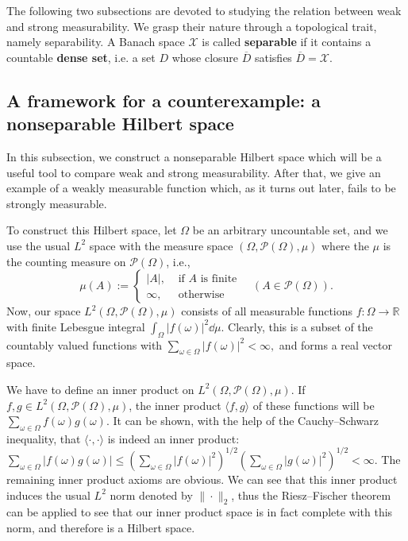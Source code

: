\documentclass[a4paper, 12pt]{article}
\newcommand{\ignore}[1]{}
\begin{document}
The following two subsections are devoted to studying the relation between weak and strong measurability. We grasp their nature through a topological trait, namely separability. A Banach space $\mathcal{X}$ is called \textbf{separable} if it contains a countable \textbf{dense set}, i.e. a set $D$ whose closure $\overline{D}$ satisfies $\overline{D} = \mathcal{X}$.
\subsection{A framework for a counterexample: a nonseparable Hilbert space}\label{section:nonseparable-hilbert-space}
In this subsection, we construct a nonseparable Hilbert space which will be a useful tool to compare weak and strong measurability. After that, we give an example of a weakly measurable function which, as it turns out later, fails to be strongly measurable.

To construct this Hilbert space, let $\Omega$ be an arbitrary uncountable set, and we use the usual $L^2$ space with the measure space $(\Omega, \mathcal{P}(\Omega), \mu)$ where the $\mu$ is the counting measure on $\mathcal{P}(\Omega)$, i.e.,
$$
\mu(A) := \left\{
    \begin{array}{ll}
      |A|, &\text{ if } A \text{ is finite} \\
      \infty, &\text{ otherwise}
    \end{array}
\right. \quad (A \in \mathcal{P}(\Omega)).
$$
Now, our space $L^2(\Omega, \mathcal{P}(\Omega), \mu)$ consists of all measurable functions $f \colon \Omega \rightarrow \mathbb{R}$ with finite Lebesgue integral $\int_{\Omega} |f(\omega)|^2 \dd{\mu}$. Clearly, this is a subset of the countably valued functions with $\sum_{\omega \in \Omega} |f(\omega)|^2 < \infty,$ and forms a real vector space.\ignore{Minkowski}

We have to define an inner product on $L^2(\Omega, \mathcal{P}(\Omega), \mu)$. If $f, g \in L^2(\Omega, \mathcal{P}(\Omega), \mu)$, the inner product $\langle f, g \rangle$ of these functions will be $\sum_{\omega \in \Omega} f(\omega)g(\omega)$. It can be shown, with the help of the Cauchy\---Schwarz inequality, that $\langle \cdot, \cdot \rangle$ is indeed an inner product: $\sum_{\omega \in \Omega} |f(\omega)g(\omega)| \leqslant \left( \sum_{\omega \in \Omega} |f(\omega)|^2 \right)^{1/2} \left( \sum_{\omega \in \Omega} |g(\omega)|^2 \right)^{1/2} < \infty$. The remaining inner product axioms are obvious. We can see that this inner product induces the usual $L^2$ norm denoted by $\| \cdot \|_2$, thus the Riesz\---Fischer theorem can be applied to see that our inner product space is in fact complete with this norm, and therefore is a Hilbert space.
\end{document}
